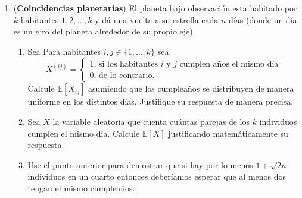 \documentclass[12pt, a4paper]{article}
\newcommand{\EE}{\mathbb{E}}
\begin{document}
\begin{enumerate}
\item ({\bf Coincidencias planetarias}) El planeta bajo observación esta habitado por $k$ habitantes $1,2,\dots, k$ y dá una vuelta a su estrella cada $n$ días (donde un día es un giro del planeta alrededor de su propio eje).
\begin{enumerate}
\item Sea Para habitantes $i,j\in \{1,\dots, k\}$ sea 
\[X^{(ij)}=\begin{cases}
1\text{, si los habitantes $i$ y $j$ cumplen años el mismo día}\\
0\text{, de lo contrario.}
\end{cases}
\]
Calcule $\EE[X_{ij}]$ asumiendo que los cumpleaños se distribuyen de manera uniforme en los distintos días. Justifique su respuesta de manera precisa.
\item Sea $X$ la variable aleatoria que cuenta cuántas parejas de los $k$ individuos cumplen el mismo día. Calcule $\EE[X]$ justificando matemáticamente su respuesta.
\item Use el punto anterior para demostrar que si hay por lo menos $1+\sqrt{2n}$ individuos en un cuarto entonces deberíamos esperar que al menos dos tengan el mismo cumpleaños.
\end{enumerate}

\end{enumerate}
\end{document}
